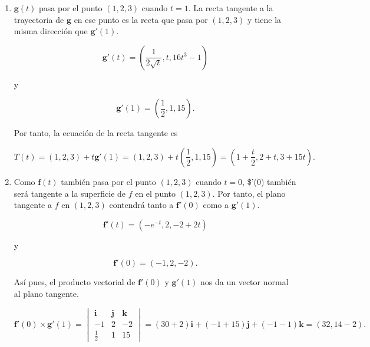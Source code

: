\documentclass[
  a4paper,
]{scrreport}
\theoremstyle{definition}
\theoremstyle{remark}
\begin{document}
\begin{tcolorbox}[enhanced jigsaw, breakable, bottomtitle=1mm, colframe=quarto-callout-tip-color-frame, opacityback=0, title=\textcolor{quarto-callout-tip-color}{\faLightbulb}\hspace{0.5em}{Solución}, arc=.35mm, coltitle=black, toptitle=1mm, toprule=.15mm, left=2mm, titlerule=0mm, leftrule=.75mm, opacitybacktitle=0.6, colbacktitle=quarto-callout-tip-color!10!white, colback=white, bottomrule=.15mm, rightrule=.15mm]

\begin{enumerate}
\def\labelenumi{\alph{enumi}.}
\item
  \(\mathbf{g}(t)\) pasa por el punto \((1,2,3)\) cuando \(t=1\). La
  recta tangente a la trayectoria de \(\mathbf{g}\) en ese punto es la
  recta que pasa por \((1,2,3)\) y tiene la misma dirección que
  \(\mathbf{g}'(1)\).

  \[
  \mathbf{g}'(t) = \left(\frac{1}{2\sqrt{t}}, t, 16t^3-1\right)
  \]

  y

  \[
  \mathbf{g}'(1) = \left(\frac{1}{2}, 1, 15\right).
  \]

  Por tanto, la ecuación de la recta tangente es

  \[
  T(t) 
  = (1,2,3) + t \mathbf{g}'(1)
  = (1,2,3) + t \left(\frac{1}{2}, 1, 15\right)
  = \left(1+\frac{t}{2}, 2+t, 3+15t\right).
  \]
\item
  Como \(\mathbf{f}(t)\) también pasa por el punto \((1,2,3)\) cuando
  \(t=0\), \$'(0) también será tangente a la superficie de
  \(f\) en el punto \((1,2,3)\). Por tanto, el plano tangente a \(f\) en
  \((1,2,3)\) contendrá tanto a \(\mathbf{f}'(0)\) como a
  \(\mathbf{g}'(1)\).

  \[
  \mathbf{f}'(t) = (-e^{-t}, 2, -2+2t)
  \]

  y

  \[
  \mathbf{f}'(0) = (-1, 2, -2).
  \]

  Así pues, el producto vectorial de \(\mathbf{f}'(0)\) y
  \(\mathbf{g}'(1)\) nos da un vector normal al plano tangente.

  \[
  \mathbf{f}'(0) \times \mathbf{g}'(1) 
  = \begin{vmatrix}
  \mathbf{i} & \mathbf{j} & \mathbf{k} \\
  -1 & 2 & -2 \\
  \frac{1}{2} & 1 & 15
  \end{vmatrix}
  = (30 + 2)\mathbf{i} + (-1+ 15)\mathbf{j} + (- 1 - 1)\mathbf{k}
  = (32,14-2).
  \]


\end{enumerate}
\end{tcolorbox}
\end{document}

